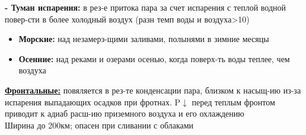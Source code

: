 \textbf{- Туман испарения:}  в рез-е притока пара за счет испарения с теплой водной повер-сти в более холодный воздух (разн темп воды и воздуха>10)
\begin{itemize}
	\item \textbf{Морские:} над незамерз-щими заливами, полынями в зимние месяцы
	\item \textbf{Осенние:} над реками и озерами осенью, когда поверх-ть воды теплее, чем воздуха
\end{itemize}
\underline{\textbf{Фронтальные:}} повяляется в рез-те конденсации пара, близком к насыщ-ию из-за испарения выпадающих осадков при фротнах. P$\downarrow$ перед теплым фронтом приводит к адиаб расш-ию приземного воздуха и его охлаждению\\
Ширина до 200км; опасен при сливании с облаками
